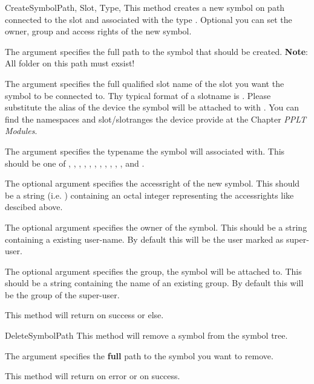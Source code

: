 \begin{methoddesc}[System]{CreateSymbol}{Path, Slot, Type, }
This method creates a new symbol on path  connected to the slot  and associated with the type
. Optional you can set the owner, group and access rights of the new symbol.

The argument  specifies the full path to the symbol that should be 
created. \textbf{Note}: All folder on this path must exsist! 

The argument  specifies the full qualified slot name of the slot you
want the symbol to be connected to. Thy typical format of a slotname is 
. Please substitute the alias of the device
the symbol will be attached to with . You can find the 
namespaces and slot/slotranges the device provide at the Chapter 
\emph{PPLT Modules}.

The argument  specifies the typename the symbol will associated 
with. This should be one of , , 
, , , , 
, , ,
, ,  and
.

The optional argument  specifies the accessright of the new symbol.
This should be a string (i.e. ) containing an octal integer 
representing the accessrights like descibed above.

The optional argument  specifies the owner of the symbol. This
should be a string containing a existing user-name. By default this will be
the user marked as super-user.

The optional argument  specifies the group, the symbol will be 
attached to. This should be a string containing the name of an existing 
group. By default this will be the group of the super-user.

This method will return  on success or  else.
\end{methoddesc}


\begin{methoddesc}[System]{DeleteSymbol}{Path}
This method will remove a symbol from the symbol tree.

The argument  specifies the \textbf{full} path
to the symbol you want to remove. 

This method will return  on error or  on success.
\end{methoddesc}


